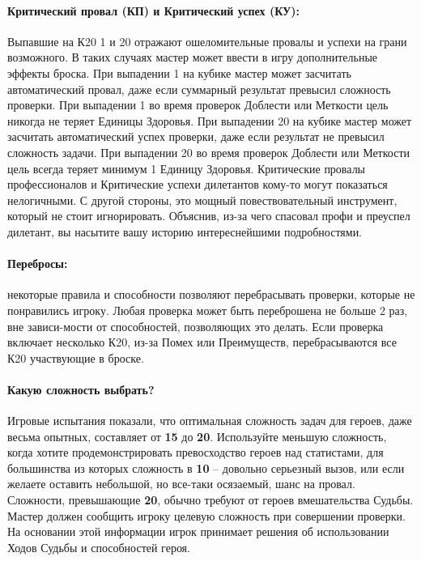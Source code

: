 \paragraph{Критический провал (КП) и Критический успех (КУ):} 
Выпавшие на К20 1 и 20 отражают ошеломительные провалы и успехи на грани возможного. В таких случаях мастер может ввести в игру дополнительные эффекты броска. 
\newline При выпадении 1 на кубике мастер может засчитать автоматический провал, даже если суммарный результат превысил сложность проверки. При выпадении 1 во время проверок Доблести или Меткости цель никогда не теряет Единицы Здоровья.
\newline При выпадении 20 на кубике мастер может засчитать автоматический успех проверки, даже если результат не превысил сложность задачи. При выпадении 20 во время проверок Доблести или Меткости цель всегда теряет минимум 1 Единицу Здоровья.
\newline Критические провалы профессионалов и Критические успехи дилетантов кому-то могут показаться нелогичными. С другой стороны, это мощный повествовательный инструмент, который не стоит игнорировать. Объяснив, из-за чего спасовал профи и преуспел дилетант, вы насытите вашу историю интереснейшими подробностями.

\paragraph{Перебросы:} некоторые правила и способности позволяют перебрасывать проверки, которые не понравились игроку. Любая проверка может быть переброшена не больше 2 раз, вне зависи-мости от способностей, позволяющих это делать. Если проверка включает несколько К20, из-за Помех или Преимуществ, перебрасываются все К20 участвующие в броске.

\paragraph{Какую сложность выбрать?} Игровые испытания показали, что оптимальная сложность задач для героев, даже весьма опытных, составляет от \textbf{15} до \textbf{20}. Используйте меньшую сложность, когда хотите продемонстрировать превосходство героев над статистами, для большинства из которых сложность в \textbf{10} – довольно серьезный вызов, или если желаете оставить небольшой, но все-таки осязаемый, шанс на провал. Сложности, превышающие \textbf{20}, обычно требуют от героев вмешательства Судьбы.
\newline Мастер должен сообщить игроку целевую сложность при совершении проверки. На основании этой информации игрок принимает решения об использовании Ходов Судьбы и способностей героя.

